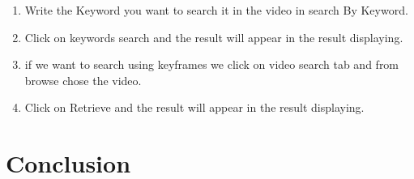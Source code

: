 \documentclass[pdftex,10pt,a4paper,oneside]{article}
\begin{document}
\begin{enumerate}
	
	
		\item 	Write the Keyword you want to search it in the video in search By Keyword.
	

\pagebreak
		\item 	Click on keywords search and the result will appear in the result displaying.


		\item if we want to search using keyframes we click on video search tab and from browse chose the video.
			
		\pagebreak
				\item 	Click on Retrieve and the result will appear in the result displaying.
						
	\end{enumerate}
\pagebreak

	\pagebreak
	\section{Conclusion}
	


	

	\pagebreak	
%	 
%	
	
	
	\printglossary
\end{document}
